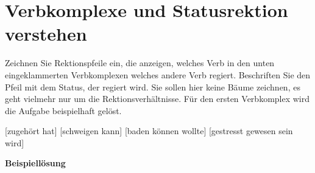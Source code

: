 \Doppelzeile

\section{Verbkomplexe und Statusrektion verstehen}

Zeichnen Sie Rektionspfeile ein, die anzeigen, welches Verb in den unten eingeklammerten Verbkomplexen welches andere Verb regiert.
Beschriften Sie den Pfeil mit dem Status, der regiert wird.
Sie sollen hier keine Bäume zeichnen, es geht vielmehr nur um die Rektionsverhältnisse.
Für den ersten Verbkomplex wird die Aufgabe beispielhaft gelöst.

\begin{exe}
\setcounter{xnumi}{0}
  \ex {} [zugehört hat]
  \ex {} [schweigen kann]
  \ex {} [baden können wollte]
  \ex {} [gestresst gewesen sein wird]
\end{exe}

\Zeile

\textbf{Beispiellösung}

\Halbzeile


\Halbzeile

